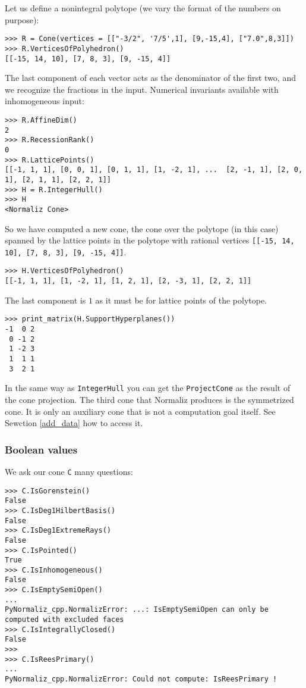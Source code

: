 \begin{small}
Let us define a nonintegral polytope (we vary the format of the numbers on purpose):
\begin{Verbatim}
>>> R = Cone(vertices = [["-3/2", '7/5',1], [9,-15,4], ["7.0",8,3]])
>>> R.VerticesOfPolyhedron()
[[-15, 14, 10], [7, 8, 3], [9, -15, 4]]
\end{Verbatim}
The last component of each vector acts as the denominator of the first two, and we recognize the fractions in the input. Numerical invariants available with inhomogeneous input:
\begin{Verbatim}
>>> R.AffineDim()
2
>>> R.RecessionRank()
0
>>> R.LatticePoints()
[[-1, 1, 1], [0, 0, 1], [0, 1, 1], [1, -2, 1], ...  [2, -1, 1], [2, 0, 1], [2, 1, 1], [2, 2, 1]]
>>> H = R.IntegerHull()
>>> H
<Normaliz Cone>
\end{Verbatim}
So we have computed a new cone, the cone over the polytope (in this case) spanned by the lattice points in the polytope with rational vertices \verb|[[-15, 14, 10], [7, 8, 3], [9, -15, 4]]|.
\begin{Verbatim}
>>> H.VerticesOfPolyhedron()
[[-1, 1, 1], [1, -2, 1], [1, 2, 1], [2, -3, 1], [2, 2, 1]]
\end{Verbatim}
The last component is $1$ as it must be for lattice points of the polytope.
\begin{Verbatim}
>>> print_matrix(H.SupportHyperplanes())
-1  0 2
 0 -1 2
 1 -2 3
 1  1 1
 3  2 1
\end{Verbatim}

In the same way as \verb*|IntegerHull| you can get the  \verb|ProjectCone| as the result of the cone projection. The third cone that Normaliz produces is the symmetrized cone. It is only an auxiliary cone that is not a computation goal itself. See Sewction \ref{add_data} how to access it.

\subsubsection{Boolean values}

We ask our cone \verb|C| many questions:
\begin{Verbatim}
>>> C.IsGorenstein()
False
>>> C.IsDeg1HilbertBasis()
False
>>> C.IsDeg1ExtremeRays()
False
>>> C.IsPointed()
True
>>> C.IsInhomogeneous()
False
>>> C.IsEmptySemiOpen()
...
PyNormaliz_cpp.NormalizError: ...: IsEmptySemiOpen can only be computed with excluded faces
>>> C.IsIntegrallyClosed()
False
>>> 
>>> C.IsReesPrimary()
...
PyNormaliz_cpp.NormalizError: Could not compute: IsReesPrimary !
\end{Verbatim}



\end{small}
